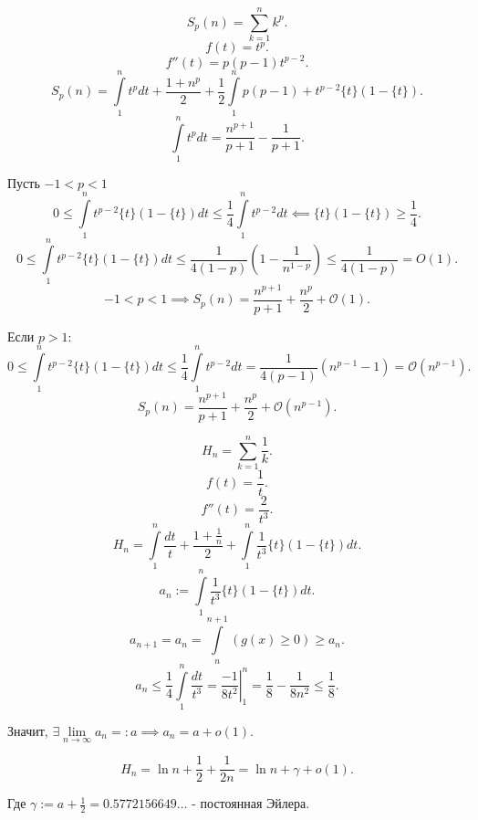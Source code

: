\begin{example} \thmslashn

    \[ S_p(n) = \sum\limits_{k=1}^{n} k^{p} .\]
    \[ f(t) = t^p .\]
    \[ f''(t) = p(p-1)t^{p-2} .\]
    \[ S_{p}(n) = \int\limits_{1}^{n} t^{p}dt + \frac{1 + n^{p}}{2} + \frac{1}{2}\int\limits_{1}^{n} p(p-1)+t^{p-2}\{t\}(1-\{t\})   .\]
    \[ \int\limits_{1}^{n} t^pdt  = \frac{n^{p+1}}{p+1} - \frac{1}{p+1}.\] 
    
    Пусть $-1 < p < 1$
    \[ 0 \le \int\limits_{1}^{n} t^{p-2}\{t\}(1-\{t\})dt \le \frac{1}{4} \int\limits_{1}^{n} t^{p-2}dt \impliedby \{t\}(1-\{t\}) \ge \frac{1}{4}      .\]
    \[ 0 \le \int\limits_{1}^{n} t^{p-2}\{t\}(1-\{t\})dt \le \frac{1}{4(1-p)}\left(1 - \frac{1}{n^{1-p}}\right)  \le \frac{1}{4(1-p)}  = O(1) .\] 
    \[ -1 < p < 1 \implies S_{p}(n) = \frac{n^{p+1}}{p+1} + \frac{n^{p}}{2} + \mathcal{O}(1) .\]
    
    Если $p>1$:
    \[ 0 \le \int\limits_{1}^{n} t^{p-2}\{t\}(1-\{t\})dt \le \frac{1}{4} \int\limits_{1}^{n} t^{p-2}dt = \frac{1}{4(p-1)}\left( n^{p-1} - 1 \right) = \mathcal{O}(n^{p-1})      .\]
    \[ S_{p}(n) = \frac{n^{p+1}}{p+1} + \frac{n^{p}}{2} + \mathcal{O}(n^{p-1}) .\] 
\end{example}
\begin{example} \thmslashn

    \[ H_n = \sum\limits_{k=1}^{n} \frac{1}{k} .\] 
    \[ f(t) = \frac{1}{t} .\]
    \[ f''(t) = \frac{2}{t^3} .\]
    \[ H_n = \int\limits_{1}^{n} \frac{dt}{t} + \frac{1+\frac{1}{n}}{2} + \int\limits_{1}^{n} \frac{1}{t^3}\{t\}(1-\{t\})dt     .\]
    \[ a_n := \int\limits_{1}^{n} \frac{1}{t^3} \{t\}(1-\{t\})dt    .\] 
    \[ a_{n+1} = a_n = \int\limits_{n}^{n+1} (g(x) \ge 0) \ge a_n  .\] 
    \[ a_{n} \le \frac{1}{4} \int\limits_{1}^{n} \frac{dt}{t^3} = \left.\frac{-1}{8t^2}\right|_{1}^{n} = \frac{1}{8} - \frac{1}{8n^2} \le \frac{1}{8}  .\]

        Значит, $\exists{} \lim\limits_{n \to \infty} a_n =: a \implies a_{n} = a + o(1)$.

        \[ H_n = \ln n + \frac{1}{2} + \frac{1}{2n} = \ln n + \gamma + o(1) .\] 
        
        Где $\gamma := a + \frac{1}{2} = 0.5772156649\ldots$ - постоянная Эйлера. 
\end{example}
